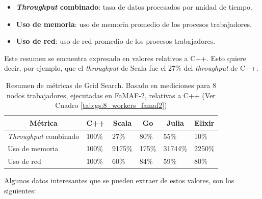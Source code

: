\documentclass[11pt]{article}
\newcommand{\english}[1]{\textit{#1}}
\begin{document}
\begin{itemize}
    \item \textbf{\english{Throughput} combinado}: tasa de datos procesados por unidad de tiempo.
    \item \textbf{Uso de memoria}: uso de memoria promedio de los procesos trabajadores.
    \item \textbf{Uso de red}: uso de red promedio de los procesos trabajadores.
\end{itemize}

Este resumen se encuentra expresado en valores relativos a C++. Esto quiere decir, por ejemplo, que el \english{throughput} de Scala fue el 27\% del \english{throughput} de C++.

\begin{table}[h]
\centering
\begin{tabular}{|l|l|l|l|l|l|}
\hline
\multicolumn{1}{|c|}{Métrica} & \multicolumn{1}{c|}{C++} & \multicolumn{1}{c|}{Scala} & \multicolumn{1}{c|}{Go} & \multicolumn{1}{c|}{Julia} & \multicolumn{1}{c|}{Elixir} \\ \hline
\english{Throughput} combinado           & 100\%                    & 27\%                       & 80\%                    & 55\%                       & 10\%                        \\ \hline
Uso de memoria                  & 100\%                    & 9175\%                     & 175\%                   & 31744\%                    & 2250\%                      \\ \hline
Uso de red                 & 100\%                    & 60\%                       & 84\%                    & 59\%                       & 80\%                        \\ \hline
\end{tabular}
\caption{Resumen de métricas de Grid Search. Basado en mediciones para 8 nodos trabajadores, ejecutadas en FaMAF-2, relativas a C++ (Ver Cuadro \ref{tab:gs:8_workers_famaf2})}
\label{tab:sis_dist:gs_metrics}
\end{table}

Algunos datos interesantes que se pueden extraer de estos valores, son los siguientes:
\end{document}
